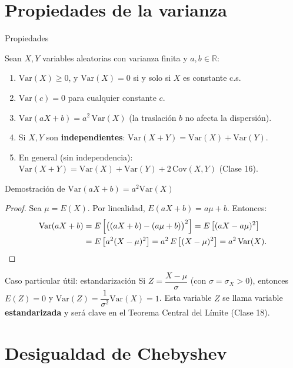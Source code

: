 \documentclass[aspectratio=169,11pt]{beamer}
\begin{document}
\section{Propiedades de la varianza}

\begin{frame}{Propiedades}
\begin{theorem}
Sean $X,Y$ variables aleatorias con varianza finita y $a,b \in \mathbb{R}$:
\begin{enumerate}
\item $\text{Var}(X) \geq 0$, y $\text{Var}(X) = 0$ si y solo si $X$ es constante c.s.
\item $\text{Var}(c) = 0$ para cualquier constante $c$.
\item $\text{Var}(aX+b) = a^2\, \text{Var}(X)$ (la traslación $b$ no afecta la dispersión).
\item Si $X, Y$ son \textbf{independientes}: $\text{Var}(X+Y) = \text{Var}(X) + \text{Var}(Y)$.
\item En general (sin independencia): $\text{Var}(X+Y) = \text{Var}(X)+\text{Var}(Y) + 2\,\text{Cov}(X,Y)$ (Clase 16).
\end{enumerate}
\end{theorem}
\end{frame}

\begin{frame}{Demostración de $\text{Var}(aX+b) = a^2 \text{Var}(X)$}
\begin{proof}
Sea $\mu = E(X)$. Por linealidad, $E(aX+b) = a\mu + b$. Entonces:
\begin{align*}
\text{Var}(aX+b) &= E\left[\big((aX+b) - (a\mu+b)\big)^2\right] = E\left[(aX - a\mu)^2\right] \\
&= E\left[a^2(X-\mu)^2\right] = a^2\, E\left[(X-\mu)^2\right] = a^2\,\text{Var}(X). \qedhere
\end{align*}
\end{proof}

\begin{alertblock}{Caso particular útil: estandarización}
Si $Z = \dfrac{X-\mu}{\sigma}$ (con $\sigma = \sigma_X > 0$), entonces $E(Z) = 0$ y $\text{Var}(Z) = \dfrac{1}{\sigma^2}\text{Var}(X) = 1$. Esta variable $Z$ se llama variable \textbf{estandarizada} y será clave en el Teorema Central del Límite (Clase 18).
\end{alertblock}
\end{frame}

\section{Desigualdad de Chebyshev}
\end{document}
